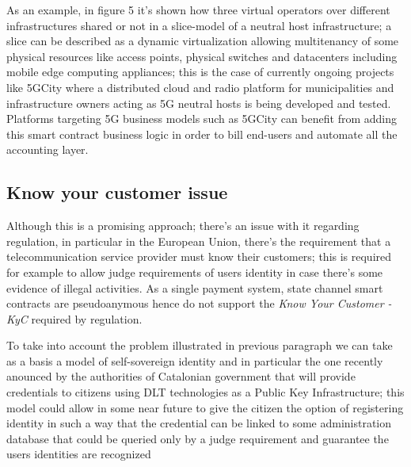 \documentclass[12pt]{amsart}
\begin{document}
\begin{multicols}{2}

As an example, in figure 5 it's shown how three virtual operators over
different infrastructures shared or not in a slice-model of a neutral host
infrastructure; a slice can be described as a dynamic virtualization
allowing multitenancy of some physical resources like access points,
physical switches and datacenters including mobile edge computing
appliances; this is the case of currently ongoing projects like
5GCity\cite{5gcity} where a distributed cloud
and radio platform for municipalities and infrastructure owners acting
as 5G neutral hosts is being developed and tested. Platforms
targeting 5G business models such as 5GCity can benefit from adding
this smart contract business logic in order to bill end-users and automate
all the accounting layer.

\subsection{Know your customer issue}

\vspace{0.35cm}

Although this is a promising approach; there's an issue with it regarding
regulation, in particular in the European Union, there's the requirement
that a telecommunication service provider must know their customers; this
is required for example to allow judge requirements of users identity
in case there's some evidence of illegal activities. As a single payment
system, state channel smart contracts are pseudoanymous hence do not
support the \textit{Know Your Customer - KyC} required by regulation.

\vspace{0.35cm}

To take into account the problem illustrated in previous paragraph
we can take as a basis a model of self-sovereign identity\cite{allen}
and in particular the one recently anounced by the authorities
of Catalonian government\cite{identicat} that will provide credentials
to citizens using DLT technologies as a Public Key Infrastructure; this
model could allow in some near future to give the citizen the option
of registering identity in such a way that the credential can be linked
to some administration database that could be queried only by a judge
requirement and guarantee the users identities are recognized



\end{multicols}
\end{document}
